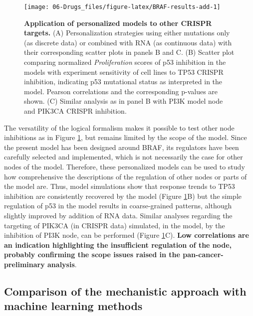 \documentclass[a4paper,12pt,twoside,onecolumn,openright,final,oldfontcommands]{memoir}
\begin{document}
\begin{figure}

{\centering \texttt{[image: 06-Drugs\_files/figure-latex/BRAF-results-add-1]} 

}

\caption[Application of personalized models to other CRISPR targets]{\textbf{Application of personalized
models to other CRISPR targets.} (A) Personalization strategies using
either mutations only (as discrete data) or combined with RNA (as
continuous data) with their corresponding scatter plots in panels B and
C. (B) Scatter plot comparing normalized \emph{Proliferation} scores of
p53 inhibition in the models with experiment sensitivity of cell lines
to TP53 CRISPR inhibition, indicating p53 mutational status as
interpreted in the model. Pearson correlations and the corresponding
p-values are shown. (C) Similar analysis as in panel B with PI3K model
node and PIK3CA CRISPR inhibition.}\label{fig:BRAF-results-add}
\end{figure}












The versatility of the logical formalism makes it possible to test other
node inhibitions as in Figure \ref{fig:BRAF-results-add}, but remains
limited by the scope of the model. Since the present model has been
designed around BRAF, its regulators have been carefully selected and
implemented, which is not necessarily the case for other nodes of the
model. Therefore, these personalized models can be used to study how
comprehensive the descriptions of the regulation of other nodes or parts
of the model are. Thus, model simulations show that response trends to
TP53 inhibition are consistently recovered by the model (Figure
\ref{fig:BRAF-results-add}B) but the simple regulation of p53 in the
model results in coarse-grained patterns, although slightly improved by
addition of RNA data. Similar analyses regarding the targeting of PIK3CA
(in CRISPR data) simulated, in the model, by the inhibition of PI3K
node, can be performed (Figure \ref{fig:BRAF-results-add}C). \textbf{Low
correlations are an indication highlighting the insufficient regulation
of the node, probably confirming the scope issues raised in the
pan-cancer-preliminary analysis}.

\subsection{Comparison of the mechanistic approach with machine learning
methods}\label{comparison-of-the-mechanistic-approach-with-machine-learning-methods}
\end{document}
